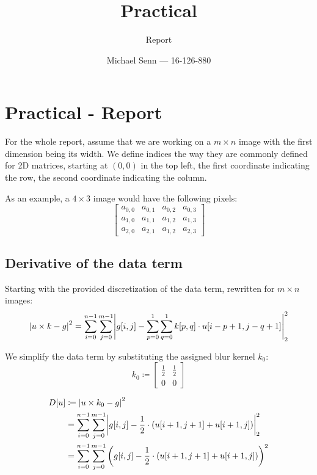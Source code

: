\documentclass[a4paper]{scrreprt}
\title{Practical \series}
\subtitle{Report}
\author{Michael Senn \maillink{michael.senn@students.unibe.ch} --- 16-126-880}
\date{\printdate}
\DeclarePairedDelimiter\abs{\lvert}{\rvert}
\newcommand{\series}{01}
\begin{document}
\maketitle


\setcounter{chapter}{\numexpr \series - 1 \relax}

\chapter{Practical - Report}

For the whole report, assume that we are working on a $m \times n$ image with
the first dimension being its width. We define indices the way they are
commonly defined for 2D matrices, starting at $(0, 0)$ in the top left, the
first coordinate indicating the row, the second coordinate indicating the
column.

As an example, a $4 \times 3$ image would have the following pixels:
\[
		\begin{bmatrix}
				a_{0, 0} & a_{0, 1} & a_{0, 2} & a_{0, 3} \\
				a_{1, 0} & a_{1, 1} & a_{1, 2} & a_{1, 3} \\
				a_{2, 0} & a_{2, 1} & a_{1, 2} & a_{2, 3}
		\end{bmatrix}
\]

\section{Derivative of the data term}
\label{sec:derivative_of_data_term}

Starting with the provided discretization of the data term, rewritten for $m
\times n$ images:
\[
		\abs*{u \times k - g}^2 = \sum_{i=0}^{n-1} \sum_{j=0}^{m-1} \abs*{g[i, j] - \sum_{p=0}^{1} \sum_{q=0}^{1} k[p, q] \cdot u[i - p + 1, j - q + 1]}_2^2
\]

We simplify the data term by substituting the assigned blur kernel $k_0$:
\[
		k_0 \coloneqq \begin{bmatrix}
				\frac{1}{2} & \frac{1}{2} \\
				0 & 0
		\end{bmatrix}
\]

\begin{align*}
		D[u] & \coloneqq \abs*{u \times k_0 - g}^2 \\ 
			 & = \sum_{i=0}^{n-1} \sum_{j=0}^{m-1} \abs*{g[i, j] - \frac{1}{2} \cdot (u[i + 1, j + 1] + u[i + 1, j])}_2^2 \\
			 & = \sum_{i=0}^{n-1} \sum_{j=0}^{m-1} \left(g[i, j] - \frac{1}{2} \cdot (u[i + 1, j + 1] + u[i + 1, j])\right)^2
\end{align*}
\end{document}
